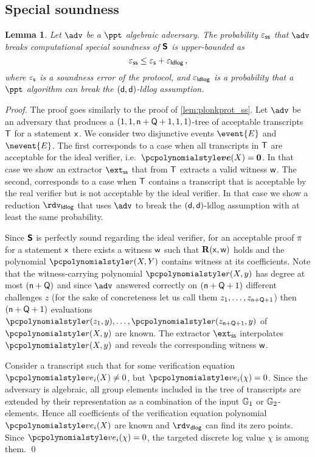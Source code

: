 \let\accentvec\vec \documentclass[runningheads,10pt]{llncs}
\def\vec#1{\mathchoice{\mbox{\boldmath$\displaystyle#1$}}
{\mbox{\boldmath$\textstyle#1$}} {\mbox{\boldmath$\scriptstyle#1$}}
{\mbox{\boldmath$\scriptscriptstyle#1$}}}
\newtheorem{lemma}[theorem]{Lemma}
\begin{document}
\subsection{Special soundness}
\begin{lemma}
		\label{lem:sonicprot_ss}
		Let $\adv$ be a $\ppt$ algebraic adversary. The probability $\varepsilon_{\mathsf{ss}}$ that
		$\adv$ breaks computational special soundness of $\bm{\mathsf{S}}$ is upper-bounded as
		\[
				\varepsilon_{\mathsf{ss}} \leq \varepsilon_{\mathsf{s}} + \varepsilon_{\mathsf{ldlog}}\,,
		\]
		where $\varepsilon_{\mathsf{s}}$ is a soundness error of the protocol, and $\varepsilon_{\mathsf{ldlog}}$ is a probability that a $\ppt$ algorithm can break the
		$(\mathsf{d}, \mathsf{d})$-ldlog assumption.
\end{lemma}
\begin{proof}
		The proof goes similarly to the proof of \cref{lem:plonkprot_ss}.
%
		Let $\adv$ be an adversary that produces a $(1, 1, \mathsf{n} + \mathsf{Q} + 1, 1, 1)$-tree of acceptable
		transcripts $\mathsf{T}$ for a statement $\mathsf{x}$. We consider two disjunctive
		events $\event{E}$ and $\nevent{E}$. The first corresponds to a case when
		all transcripts in $\mathsf{T}$ are acceptable for the ideal verifier,
		i.e.~$\vec{\vereq}(X) = \vec{0}$. In that case we show an extractor $\extss$ that
		from $\mathsf{T}$ extracts a valid witness $\mathsf{w}$. The second, corresponds to
		a case when $\mathsf{T}$ contains a transcript that is acceptable by the
		real verifier but is not acceptable by the ideal verifier. In that case we
		show a reduction $\rdvldlog$ that uses $\adv$ to break the $(\mathsf{d},
		\mathsf{d})$-ldlog
		assumption with at least the same probability.

		Since $\bm{\mathsf{S}}$ is perfectly sound regarding the ideal verifier, for an
		acceptable proof $\pi$ for a statement $\mathsf{x}$ there exists a witness
		$\mathsf{w}$ such that $\mathbf{R}(\mathsf{x}, \mathsf{w})$ holds and the polynomial $\p{r}(X, Y)$
		contains witness at its coefficients.  Note that the witness-carrying
		polynomial $\p{r}(X, y)$ has degree at most $(\mathsf{n} + \mathsf{Q})$
		and since $\adv$ answered correctly on $(\mathsf{n} + \mathsf{Q} + 1)$
		different challenges $z$ (for the sake of concreteness let us call them
		$z_1, \ldots, z_{\mathsf{n} + \mathsf{Q} + 1}$) then $(\mathsf{n} +
		\mathsf{Q} + 1)$ evaluations $\p{r}(z_1, y), \ldots, \p{r}(z_{\multconstr
		+ \linconstr + 1}, y)$ of $\p{r}(X, y)$ are known. The extractor $\extss$
		interpolates $\p{r}(X, y)$ and reveals the corresponding witness $\mathsf{w}$.

		 Consider a transcript such that for some verification equation
		$\vereq_i(X) \neq 0$, but $\vereq_i(\chi) = 0$.
		Since the adversary is algebraic, all group elements included in the tree of
  	transcripts are extended by their representation as a combination of the input
  	$\mathbb{G}_1$ or $\mathbb{G}_2$-elements. Hence all coefficients of the verification equation polynomial
  	$\vereq_i(X)$ are known and $\rdvdlog$ can find its zero points. Since
  	$\vereq_i(\chi) = 0$, the targeted discrete log value $\chi$ is among them.
		\qed		
\end{proof}
\end{document}
